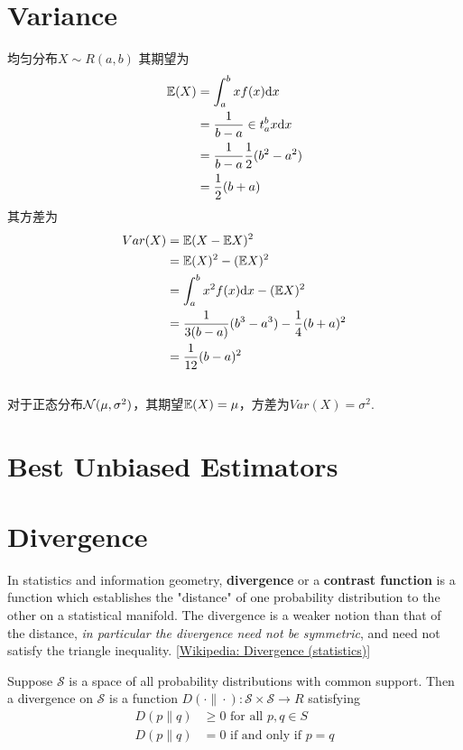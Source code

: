 \section{Variance}
均匀分布$X \sim R(a, b)$
其期望为
\begin{equation}
    \begin{split}
        \mathbb{E}(X) &= \int_{a}^{b}x f(x) \mathrm{d} x		\\
        &= \frac{1}{b-a}\in t_{a}^{b}x \mathrm{d} x	\\
        &= \frac{1}{b-a} \frac{1}{2} (b^2 - a^2)	\\
        &= \frac{1}{2}(b + a)
    \end{split}
\end{equation}
其方差为
\begin{equation}
    \begin{split}
        Var(X) &= \mathbb{E}(X - \mathbb{E} X)^2  \\
        &= \mathbb{E}(X)^2 - (\mathbb{E} X)^2 \\
        &= \int_{a}^{b} x^2 f(x) \mathrm{d} x - (\mathbb{E} X)^2 \\
        &= \frac{1}{3(b-a)} (b^3 - a^3) - \frac{1}{4}(b+a)^2 \\
        &= \frac{1}{12}(b-a)^2
    \end{split}
\end{equation}
\\
对于正态分布$\mathcal{N}(\mu, \sigma ^2)$，其期望$\mathbb{E}(X) = \mu$，方差为$Var(X) = \sigma^2$.


\section{Best Unbiased Estimators}


\section{Divergence}
In statistics and information geometry, \textbf{divergence} or a \textbf{contrast function} is a function
which establishes the "distance" of one probability distribution to the other on a statistical manifold.
The divergence is a weaker notion than that of the distance, \textit{in particular the divergence need not be symmetric},
and need not satisfy the triangle inequality. [\href{https://en.wikipedia.org/wiki/Divergence_(statistics)}{Wikipedia: Divergence (statistics)}]

Suppose $\mathcal{S}$ is a space of all probability distributions with common support.
Then a divergence on $\mathcal{S}$ is a function $D(\cdot\|\cdot): \mathcal{S} \times \mathcal{S} \rightarrow R$ satisfying
\begin{align}
    D(p\|q) &\geq 0 \text{ for all }p, q \in S \\
    D(p\|q) &= 0 \text{ if and only if }p = q
\end{align}

